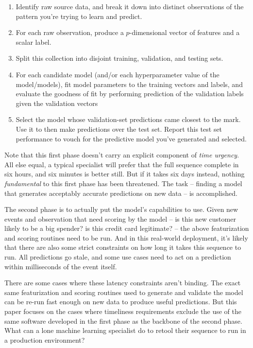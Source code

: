 \documentclass{article}
\begin{document}
\begin{enumerate}
\item Identify raw source data, and break it down into distinct observations of the pattern you're trying to learn and predict.
\item For each raw observation, produce a $p$-dimensional vector of features and a scalar label.
\item Split this collection into disjoint training, validation, and testing sets.
\item For each candidate model (and/or each hyperparameter value of the model/models), fit model parameters to the training vectors and labels, and evaluate the goodness of fit by performing prediction of the validation labels given the validation vectors
\item Select the model whose validation-set predictions came closest to the mark. Use it to then make predictions over the test set. Report this test set performance to vouch for the predictive model you've generated and selected.
\end{enumerate}

Note that this first phase doesn't carry an explicit component of \emph{time urgency}. All else equal, a typical specialist will prefer that the full sequence complete in six hours, and six minutes is better still. But if it takes six days instead, nothing \emph{fundamental} to this first phase has been threatened. The task -- finding a model that generates acceptably accurate predictions on new data -- is accomplished.

The second phase is to actually put the model's capabilities to use. Given new events and observation that need scoring by the model -- is this new customer likely to be a big spender? is this credit card legitimate? -- the above featurization and scoring routines need to be run. And in this real-world deployment, it's likely that there are also some strict constraints on how long it takes this sequence to run. All predictions go stale, and some use cases need to act on a prediction within milliseconds of the event itself.

There are some cases where these latency constraints aren't binding. The exact same featurization and scoring routines used to generate and validate the model can be re-run fast enough on new data to produce useful predictions. But this paper focuses on the cases where timeliness requirements exclude the use of the same software developed in the first phase as the backbone of the second phase. What can a lone machine learning specialist do to retool their sequence to run in a production environment?
\end{document}

